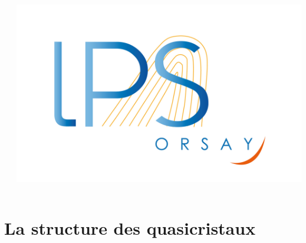 \documentclass[xcolor=x11names,compress,professionalfonts, aspectratio=169]{beamer}
\renewcommand{\(}{\begin{columns}}
\renewcommand{\)}{\end{columns}}
\newcommand{\<}[1]{\begin{column}{#1}}
\renewcommand{\>}{\end{column}}
\begin{document}
\begin{frame}
\begin{columns}
\begin{column}{6cm}
\end{column}
\begin{column}{2cm}
~\\
~\\
~\\
~\\
\raggedleft
\includegraphics[scale=.15]{img/0_cover/logo-lps.jpg}
\end{column}
\end{columns}
\end{frame}

\section{La structure des quasicristaux}
\end{document}
